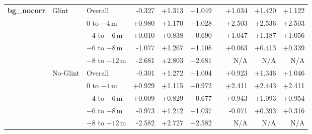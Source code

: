 \begin{table}[htbp]
{\begin{tabular}{lll rrr c rrr}
\multirow{10}{*}{\textbf{bg\_nocorr}} & \multirow{5}{*}{Glint} & Overall              &  -0.327 & +1.313 & +1.049 & &  +1.034 & +1.420 & +1.122 \\
                           &                      & $0$ to $-4$\,m       &  +0.980 & +1.170 & +1.028 & &  +2.503 & +2.536 & +2.503 \\
                           &                      & $-4$ to $-6$\,m      &  +0.010 & +0.838 & +0.690 & &  +1.047 & +1.187 & +1.056 \\
                           &                      & $-6$ to $-8$\,m      &  -1.077 & +1.267 & +1.108 & &  +0.063 & +0.413 & +0.339 \\
                           &                      & $-8$ to $-12$\,m     &  -2.681 & +2.803 & +2.681 & &     N/A &   N/A &   N/A \\
\cmidrule(lr){2-10}
                           & \multirow{5}{*}{No-Glint} & Overall              &  -0.301 & +1.272 & +1.004 & &  +0.923 & +1.346 & +1.046 \\
                           &                      & $0$ to $-4$\,m       &  +0.929 & +1.115 & +0.972 & &  +2.411 & +2.443 & +2.411 \\
                           &                      & $-4$ to $-6$\,m      &  +0.009 & +0.829 & +0.677 & &  +0.943 & +1.093 & +0.954 \\
                           &                      & $-6$ to $-8$\,m      &  -0.973 & +1.212 & +1.037 & &  -0.071 & +0.393 & +0.316 \\
                           &                      & $-8$ to $-12$\,m     &  -2.582 & +2.727 & +2.582 & &     N/A &   N/A &   N/A \\
\midrule


\end{tabular}}
\end{table}
